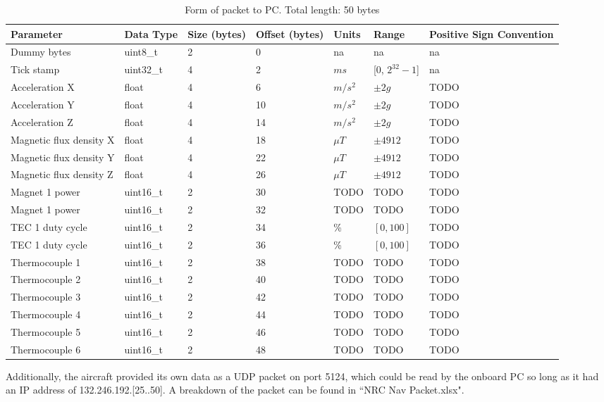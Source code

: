 \documentclass{article}
\begin{document}
\begin{table}[!ht]
	\centering
	\begin{tabular}{ | m{4cm} | m{2cm} | m{2cm} | m{2cm}| m{1cm}| m{2cm}| m{2cm}|  } 
		\hline
		Parameter & Data Type & Size (bytes) & Offset (bytes) & Units & Range & Positive Sign Convention \\
		\hline
		Dummy bytes & uint8\_t & 2 & 0 & na & na & na \\
		\hline
		Tick stamp & uint32\_t & 4 & 2 & $ms$ & [0, $2^{32}-1$] & na \\ 
		\hline
		Acceleration X & float & 4 & 6 & $m/s^2$ & $\pm 2g$ & TODO \\ 
		\hline
		Acceleration Y & float & 4 & 10 & $m/s^2$ & $\pm 2g$ & TODO \\ 
		\hline
		Acceleration Z & float & 4 & 14 & $m/s^2$ & $\pm 2g$ & TODO \\ 
		\hline
		Magnetic flux density X & float & 4 & 18 & $\mu T$ & $\pm 4912$ & TODO \\ 
		\hline
		Magnetic flux density Y & float & 4 & 22 & $\mu T$ & $\pm 4912$ & TODO \\ 
		\hline
		Magnetic flux density Z & float & 4 & 26 & $\mu T$ & $\pm 4912$ & TODO \\ 
		\hline
		Magnet 1 power & uint16\_t & 2 & 30 & TODO & TODO & TODO \\ 
		\hline
		Magnet 1 power & uint16\_t & 2 & 32 & TODO & TODO & TODO \\ 
		\hline
	    TEC 1 duty cycle & uint16\_t & 2 & 34 & \% & $[0, 100]$ & TODO \\ 
		\hline
		TEC 1 duty cycle & uint16\_t & 2 & 36 & \% & $[0, 100]$ & TODO \\ 
		\hline
		Thermocouple 1 & uint16\_t & 2 & 38 & TODO & TODO & TODO \\ 
		\hline
		Thermocouple 2 & uint16\_t & 2 & 40 & TODO & TODO & TODO \\ 
		\hline
		Thermocouple 3 & uint16\_t & 2 & 42 & TODO & TODO & TODO \\ 
		\hline
		Thermocouple 4 & uint16\_t & 2 & 44 & TODO & TODO & TODO \\ 
		\hline
		Thermocouple 5 & uint16\_t & 2 & 46 & TODO & TODO & TODO \\ 
		\hline
		Thermocouple 6 & uint16\_t & 2 & 48 & TODO & TODO & TODO \\ 
		\hline
		
	\end{tabular}
	\caption{Form of packet to PC. Total length: 50 bytes}
	\label{tab:PCPacketFormat}
\end{table}

Additionally, the aircraft provided its own data as a UDP packet on port 5124, which could be read by the onboard PC so long as it had an IP address of 132.246.192.[25..50]. A breakdown of the packet can be found in ``NRC Nav Packet.xlsx".
\clearpage

\end{document}
